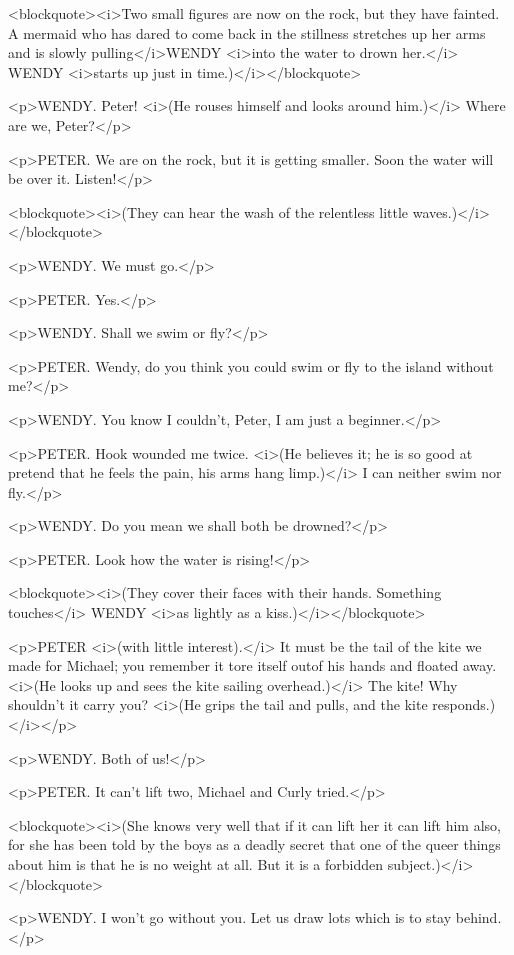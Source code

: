 <blockquote><i>Two small figures are now on the rock, but they have
fainted. A mermaid who has dared to come back in the stillness
stretches up her arms and is slowly pulling</i>WENDY <i>into the
water to drown her.</i> WENDY <i>starts up just in
time.)</i></blockquote>

<p>WENDY. Peter! <i>(He rouses himself and looks around him.)</i>
Where are we, Peter?</p>

<p>PETER. We are on the rock, but it is getting smaller. Soon the
water will be over it. Listen!</p>

<blockquote><i>(They can hear the wash of the relentless little
waves.)</i></blockquote>

<p>WENDY. We must go.</p>

<p>PETER. Yes.</p>

<p>WENDY. Shall we swim or fly?</p>

<p>PETER. Wendy, do you think you could swim or fly to the island
without me?</p>

<p>WENDY. You know I couldn't, Peter, I am just a beginner.</p>

<p>PETER. Hook wounded me twice. <i>(He believes it; he is so good at
pretend that he feels the pain, his arms hang limp.)</i> I can
neither swim nor fly.</p>

<p>WENDY. Do you mean we shall both be drowned?</p>

<p>PETER. Look how the water is rising!</p>

<blockquote><i>(They cover their faces with their hands. Something
touches</i> WENDY <i>as lightly as a kiss.)</i></blockquote>

<p>PETER <i>(with little interest).</i> It must be the tail of the
kite we made for Michael; you remember it tore itself outof his hands
and floated away. <i>(He looks up and sees the kite sailing
overhead.)</i> The kite! Why shouldn't it carry you? <i>(He grips the
tail and pulls, and the kite responds.)</i></p>

<p>WENDY. Both of us!</p>

<p>PETER. It can't lift two, Michael and Curly tried.</p>

<blockquote><i>(She knows very well that if it can lift her it can
lift him also, for she has been told by the boys as a deadly secret
that one of the queer things about him is that he is no weight at
all. But it is a forbidden subject.)</i></blockquote>

<p>WENDY. I won't go without you. Let us draw lots which is to stay
behind.</p>

